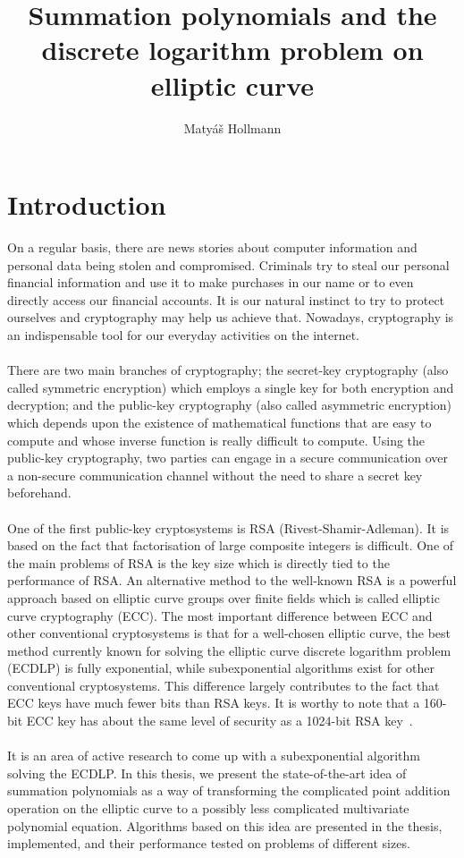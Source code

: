 \documentclass[thesis=M,english]{FITthesis}[2012/10/20]
\title{Summation polynomials and the discrete logarithm problem on elliptic curve}
\author{Matyáš Hollmann} %
\theoremstyle{remark}
\theoremstyle{definition}
\begin{document}

\chapter{Introduction}
On a regular basis, there are news stories about computer information and personal data being stolen and compromised. Criminals try to steal our personal financial information and use it to make purchases in our name or to even directly access our financial accounts. It is our natural instinct to try to protect ourselves and cryptography may help us achieve that. Nowadays, cryptography is an indispensable tool for our everyday activities on the internet. \\ \\
\noindent There are two main branches of cryptography; the secret-key cryptography (also called symmetric encryption) which employs a single key for both encryption and decryption; and the public-key cryptography (also called asymmetric encryption) which depends upon the existence of mathematical functions that are easy to compute and whose inverse function is really difficult to compute. Using the public-key cryptography, two parties can engage in a secure communication over a non-secure communication channel without the need to share a secret key beforehand. \\ \\
\noindent One of the first public-key cryptosystems is RSA (Rivest-Shamir-Adleman). It is based on the fact that factorisation of large composite integers is difficult. One of the main problems of RSA is the key size which is directly tied to the performance of RSA. An alternative method to the well-known RSA is a powerful approach based on elliptic curve groups over finite fields which is called elliptic curve cryptography (ECC). The most important difference between ECC and other conventional cryptosystems is that for a well-chosen elliptic curve, the best method currently known for solving the elliptic curve discrete logarithm problem (ECDLP) is fully exponential, while subexponential algorithms exist for other conventional cryptosystems. This difference largely contributes to the fact that ECC keys have much fewer bits than RSA keys. It is worthy to note that a 160-bit ECC key has about the same level of security as a 1024-bit RSA key~\cite{secTest}.
\\
\\
\noindent 
It is an area of active research to come up with a subexponential algorithm solving the ECDLP. In this thesis, we present the state-of-the-art idea of summation polynomials as a way of transforming the complicated point addition operation on the elliptic curve to a possibly less complicated multivariate polynomial equation. Algorithms based on this idea are presented in the thesis, implemented, and their performance tested on problems of different sizes.  
\end{document}
